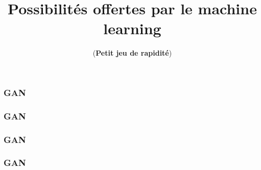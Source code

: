 \documentclass{formation}
\title{Possibilités offertes par le machine learning}
\subtitle{(\textbf{Petit jeu de rapidité})}
\begin{document}
\maketitle

\begin{frame}
  \frametitle{GAN}
  \begin{minipage}[l]{0.49\linewidth}
  \end{minipage}\hfill
  \begin{minipage}[l]{0.49\linewidth}
  \end{minipage}\hfill
\end{frame}

\begin{frame}
  \frametitle{GAN}
\end{frame}

\begin{frame}
  \frametitle{GAN}
\end{frame}

\begin{frame}
  \frametitle{GAN}
\end{frame}
\end{document}
